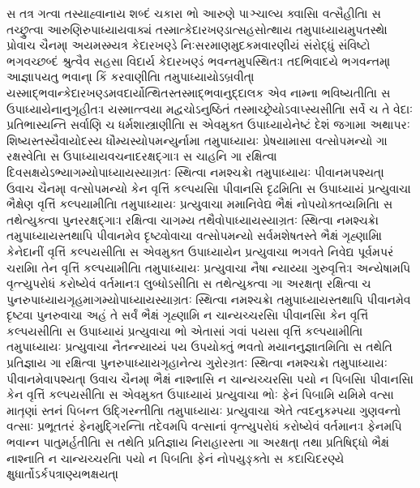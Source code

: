 \documentclass[a4paper,12pt]{article}
\begin{document}
સ તત્ર ગત્વા તસ્યાહ્વાનાય શબ્દં ચકાર। ભો આરુણે પાઞ્ચાલ્ય ક્વાસિ। વત્સૈહીતિ।
સ તચ્છ્રુત્વા આરુણિરુપાધ્યાયવાક્યં તસ્માત્કેદારખણ્ડાત્સહસોત્થાય તમુપાધ્યાયમુપતસ્થે। પ્રોવાચ ચૈનમ્। અયમસ્મ્યત્ર કેદારખણ્ડે નિઃસરમાણમુદકમવારણીયં સંરોદ્ધું સંવિષ્ટો ભગવચ્છબ્દં શ્રુત્વૈવ સહસા વિદાર્ય કેદારખણ્ડં ભવન્તમુપસ્થિતઃ। તદભિવાદયે ભગવન્તમ્। આજ્ઞાપયતુ ભવાન્। કિં કરવાણીતિ।
તમુપાધ્યાયોઽબ્રવીત્। યસ્માદ્ભવાન્કેદારખણ્ડમવદાર્યોત્થિતસ્તસ્માદ્ભવાનુદ્દાલક એવ નામ્ના ભવિષ્યતીતિ।
સ ઉપાધ્યાયેનાનુગૃહીતઃ। યસ્માત્ત્વયા મદ્વચોઽનુષ્ઠિતં તસ્માચ્છ્રેયોઽવાપ્સ્યસીતિ। સર્વે ચ તે વેદાઃ પ્રતિભાસ્યન્તિ સર્વાણિ ચ ધર્મશાસ્ત્રાણીતિ।
સ એવમુક્ત ઉપાધ્યાયેનેષ્ટં દેશં જગામ।
અથાપરઃ શિષ્યસ્તસ્યૈવાયોદસ્ય ધૌમ્યસ્યોપમન્યુર્નામ।
તમુપાધ્યાયઃ પ્રેષયામાસ। વત્સોપમન્યો ગા રક્ષસ્વેતિ।
સ ઉપાધ્યાયવચનાદરક્ષદ્ગાઃ। સ ચાહનિ ગા રક્ષિત્વા દિવસક્ષયેઽભ્યાગમ્યોપાધ્યાયસ્યાગ્રતઃ સ્થિત્વા નમશ્ચક્રે।
તમુપાધ્યાયઃ પીવાનમપશ્યત્। ઉવાચ ચૈનમ્। વત્સોપમન્યો કેન વૃત્તિં કલ્પયસિ। પીવાનસિ દૃઢમિતિ।
સ ઉપાધ્યાયં પ્રત્યુવાચ। ભૈક્ષેણ વૃત્તિં કલ્પયામીતિ।
તમુપાધ્યાયઃ પ્રત્યુવાચ। મમાનિવેદ્ય ભૈક્ષં નોપયોક્તવ્યમિતિ।
સ તથેત્યુક્ત્વા પુનરરક્ષદ્ગાઃ। રક્ષિત્વા ચાગમ્ય તથૈવોપાધ્યાયસ્યાગ્રતઃ સ્થિત્વા નમશ્ચક્રે।
તમુપાધ્યાયસ્તથાપિ પીવાનમેવ દૃષ્ટ્વોવાચ। વત્સોપમન્યો સર્વમશેષતસ્તે ભૈક્ષં ગૃહ્ણામિ। કેનેદાનીં વૃત્તિં કલ્પયસીતિ।
સ એવમુક્ત ઉપાધ્યાયેન પ્રત્યુવાચ। ભગવતે નિવેદ્ય પૂર્વમપરં ચરામિ। તેન વૃત્તિં કલ્પયામીતિ।
તમુપાધ્યાયઃ પ્રત્યુવાચ। નૈષા ન્યાય્યા ગુરુવૃત્તિઃ। અન્યેષામપિ વૃત્ત્યુપરોધં કરોષ્યેવં વર્તમાનઃ। લુબ્ધોઽસીતિ।
સ તથેત્યુક્ત્વા ગા અરક્ષત્। રક્ષિત્વા ચ પુનરુપાધ્યાયગૃહમાગમ્યોપાધ્યાયસ્યાગ્રતઃ સ્થિત્વા નમશ્ચક્રે।
તમુપાધ્યાયસ્તથાપિ પીવાનમેવ દૃષ્ટ્વા પુનરુવાચ। અહં તે સર્વં ભૈક્ષં ગૃહ્ણામિ ન ચાન્યચ્ચરસિ। પીવાનસિ। કેન વૃત્તિં કલ્પયસીતિ।
સ ઉપાધ્યાયં પ્રત્યુવાચ। ભો એતાસાં ગવાં પયસા વૃત્તિં કલ્પયામીતિ।
તમુપાધ્યાયઃ પ્રત્યુવાચ। નૈતન્ન્યાય્યં પય ઉપયોક્તું ભવતો મયાનનુજ્ઞાતમિતિ।
સ તથેતિ પ્રતિજ્ઞાય ગા રક્ષિત્વા પુનરુપાધ્યાયગૃહાનેત્ય ગુરોરગ્રતઃ સ્થિત્વા નમશ્ચક્રે।
તમુપાધ્યાયઃ પીવાનમેવાપશ્યત્। ઉવાચ ચૈનમ્। ભૈક્ષં નાશ્નાસિ ન ચાન્યચ્ચરસિ। પયો ન પિબસિ। પીવાનસિ। કેન વૃત્તિં કલ્પયસીતિ।
સ એવમુક્ત ઉપાધ્યાયં પ્રત્યુવાચ। ભોઃ ફેનં પિબામિ યમિમે વત્સા માતૄણાં સ્તનં પિબન્ત ઉદ્ગિરન્તીતિ।
તમુપાધ્યાયઃ પ્રત્યુવાચ। એતે ત્વદનુકમ્પયા ગુણવન્તો વત્સાઃ પ્રભૂતતરં ફેનમુદ્ગિરન્તિ। તદેવમપિ વત્સાનાં વૃત્ત્યુપરોધં કરોષ્યેવં વર્તમાનઃ। ફેનમપિ ભવાન્ન પાતુમર્હતીતિ।
સ તથેતિ પ્રતિજ્ઞાય નિરાહારસ્તા ગા અરક્ષત્। તથા પ્રતિષિદ્ધો ભૈક્ષં નાશ્નાતિ ન ચાન્યચ્ચરતિ। પયો ન પિબતિ। ફેનં નોપયુઙ્ક્તે।
સ કદાચિદરણ્યે ક્ષુધાર્તોઽર્કપત્રાણ્યભક્ષયત્।
\end{document}
